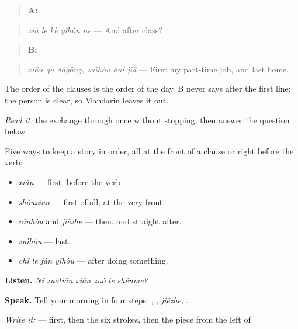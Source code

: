 \begin{quote}
\textbf{A:} 
\end{quote}

\begin{quote}
\emph{xià le kè yǐhòu ne} — And after class?
\end{quote}

\begin{quote}
\textbf{B:}  
\end{quote}

\begin{quote}
\emph{xiān qù dǎgōng, zuìhòu huí jiā} — First my part-time job, and last home.
\end{quote}

The order of the clauses is the order of the day. B never says  after the first line: the person is clear, so Mandarin leaves it out.

\begin{tcolorbox}[breakable,skin=enhanced,colback=orange!6,colframe=orange!45!black,boxrule=0.5pt,arc=1mm,left=6pt,right=6pt,top=4pt,bottom=4pt,fonttitle=\bfseries,title={Read this}]
\emph{Read it:} the exchange through once without stopping, then answer the question below
\end{tcolorbox}

\begin{grammarlens}[title={What you've built — telling it in order}]
Five ways to keep a story in order, all at the front of a clause or right before the verb:

\begin{itemize}
\raggedright
  \item \textbf{} \emph{xiān} — first, before the verb.
  \item \emph{shǒuxiān} — first of all, at the very front.
  \item \textbf{} \emph{ránhòu} and \emph{jiēzhe} — then, and straight after.
  \item \textbf{} \emph{zuìhòu} — last.
  \item \textbf{} \emph{chī le fàn yǐhòu} — after doing something.
\end{itemize}

\textbf{Listen.} \emph{Nǐ zuótiān xiān zuò le shénme?}

\textbf{Speak.} Tell your morning in four steps: , , \emph{jiēzhe}, .

\emph{Write it:}  —  first, then the six strokes, then the piece from the left of 
\end{grammarlens}

